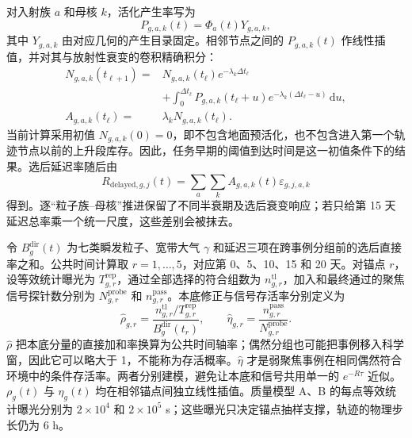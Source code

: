 \documentclass[11pt]{article}
\begin{document}
对入射族 $a$ 和母核 $k$，活化产生率写为
\begin{equation}
 P_{g,a,k}(t)=\Phi_a(t)Y_{g,a,k},
 \label{eq:activation_production_zh}
\end{equation}
其中 $Y_{g,a,k}$ 由对应几何的产生目录固定。相邻节点之间的 $P_{g,a,k}(t)$ 作线性插值，并对其与放射性衰变的卷积精确积分：
\begin{equation}
 \begin{aligned}
 N_{g,a,k}(t_{\ell+1})={}&N_{g,a,k}(t_\ell)e^{-\lambda_k\Delta t_\ell}\\
 &+\int_0^{\Delta t_\ell}P_{g,a,k}(t_\ell+u)
 e^{-\lambda_k(\Delta t_\ell-u)}\,\mathrm du,\\
 A_{g,a,k}(t_\ell)={}&\lambda_kN_{g,a,k}(t_\ell).
 \end{aligned}
 \label{eq:delayed_inventory_zh}
\end{equation}
当前计算采用初值 $N_{g,a,k}(0)=0$，即不包含地面预活化，也不包含进入第一个轨迹节点以前的上升段库存。因此，任务早期的阈值到达时间是这一初值条件下的结果。选后延迟率随后由
\begin{equation}
 R_{\mathrm{delayed},g,j}(t)=
 \sum_a\sum_kA_{g,a,k}(t)\varepsilon_{g,j,a,k}
 \label{eq:delayed_selected_zh}
\end{equation}
得到。逐“粒子族--母核”推进保留了不同半衰期及选后衰变响应；若只给第 15 天延迟总率乘一个统一尺度，这些差别会被抹去。

令 $B^{\mathrm{dir}}_g(t)$ 为七类瞬发粒子、宽带大气 $\gamma$ 和延迟三项在跨事例分组前的选后直接率之和。公共时间计算取 $r=1,\ldots,5$，对应第 0、5、10、15 和 20 天。对锚点 $r$，设等效统计曝光为 $T^{\mathrm{rep}}_{g,r}$，通过全部选择的符合组数为 $n^{\mathrm{tl}}_{g,r}$，加入和最终通过的聚焦信号探针数分别为 $N^{\mathrm{probe}}_{g,r}$ 和 $n^{\mathrm{pass}}_{g,r}$。本底修正与信号存活率分别定义为
\begin{equation}
 \widehat\rho_{g,r}=
 \frac{n^{\mathrm{tl}}_{g,r}/T^{\mathrm{rep}}_{g,r}}
 {B^{\mathrm{dir}}_g(t_r)},\qquad
 \widehat\eta_{g,r}=
 \frac{n^{\mathrm{pass}}_{g,r}}{N^{\mathrm{probe}}_{g,r}}.
 \label{eq:anchor_time_factors_zh}
\end{equation}
$\widehat\rho$ 把本底分量的直接加和率换算为公共时间轴率；偶然分组也可能把事例移入科学窗，因此它可以略大于 1，不能称为存活概率。$\widehat\eta$ 才是弱聚焦事例在相同偶然符合环境中的条件存活率。两者分别建模，避免让本底和信号共用单一的 $e^{-R\tau}$ 近似。$\rho_g(t)$ 与 $\eta_g(t)$ 均在相邻锚点间独立线性插值。质量模型 A、B 的每点等效统计曝光分别为 $2\times10^4$ 和 $2\times10^5$ s；这些曝光只决定锚点抽样支撑，轨迹的物理步长仍为 6 h。
\end{document}
